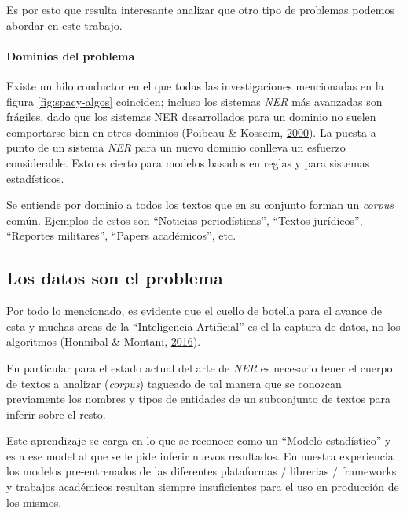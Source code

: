 \documentclass[12pt,a4paper,]{scrartcl}
\let\oldparagraph\paragraph
\renewcommand{\paragraph}[1]{\oldparagraph{#1}\mbox{}}
\begin{document}
Es por esto que resulta interesante analizar que otro tipo de problemas podemos abordar en este trabajo.

\hypertarget{dominios-del-problema}{%
\paragraph{Dominios del problema}\label{dominios-del-problema}}

Existe un hilo conductor en el que todas las investigaciones mencionadas en la figura \ref{fig:spacy-algos} coinciden; incluso los sistemas \emph{NER} más avanzadas son frágiles, dado que los sistemas NER desarrollados para un dominio no suelen comportarse bien en otros dominios (Poibeau \& Kosseim, \protect\hyperlink{ref-Poibeau2000ProperNE}{2000}). La puesta a punto de un sistema \emph{NER} para un nuevo dominio conlleva un esfuerzo considerable. Esto es cierto para modelos basados en reglas y para sistemas estadísticos.

Se entiende por dominio a todos los textos que en su conjunto forman un \emph{corpus} común. Ejemplos de estos son \enquote{Noticias periodísticas}, \enquote{Textos jurídicos}, \enquote{Reportes militares}, \enquote{Papers académicos}, etc.

\hypertarget{los-datos-son-el-problema}{%
\subsection{Los datos son el problema}\label{los-datos-son-el-problema}}

Por todo lo mencionado, es evidente que el cuello de botella para el avance de esta y muchas areas de la \enquote{Inteligencia Artificial} es el la captura de datos, no los algoritmos (Honnibal \& Montani, \protect\hyperlink{ref-montani_AI}{2016}).

En particular para el estado actual del arte de \emph{NER} es necesario tener el cuerpo de textos a analizar (\emph{corpus}) tagueado de tal manera que se conozcan previamente los nombres y tipos de entidades de un subconjunto de textos para inferir sobre el resto.

Este aprendizaje se carga en lo que se reconoce como un \enquote{Modelo estadístico} y es a ese model al que se le pide inferir nuevos resultados. En nuestra experiencia los modelos pre-entrenados de las diferentes plataformas / librerias / frameworks y trabajos académicos resultan siempre insuficientes para el uso en producción de los mismos.
\end{document}
